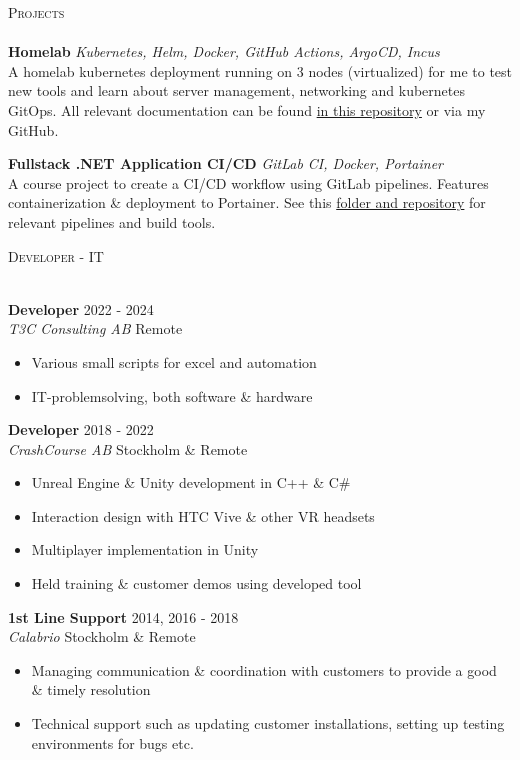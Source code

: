 \documentclass[a4paper]{article}
\newcommand{\lineunder} {
    \vspace*{-8pt} \\
    \hspace*{-18pt} \hrulefill \\
}
\newcommand{\header} [1] {
    {\hspace*{-18pt}\vspace*{6pt} \textsc{#1}}
    \vspace*{-6pt} \lineunder
}
\begin{document}
\header{Projects}
{\textbf{Homelab}} {\sl Kubernetes, Helm, Docker, GitHub Actions, ArgoCD, Incus} \\
A homelab kubernetes deployment running on 3 nodes (virtualized) for me to test new tools and learn about server management, networking and kubernetes GitOps. All relevant documentation can be found \href{https://github.com/pontusc/homelab}{in this repository} or via my GitHub.\\
\vspace{4mm}

{\textbf{Fullstack .NET Application CI/CD}} {\sl GitLab CI, Docker, Portainer} \\
A course project to create a CI/CD workflow using GitLab pipelines. Features containerization \& deployment to Portainer. See this \href{https://github.com/pontusc/devops-doe24/tree/main/pipeline-utilities}{folder and repository} for relevant pipelines and build tools.\\
\vspace{8mm}

\header{Developer - IT}
\vspace{4mm}

\textbf{Developer} \hfill 2022 - 2024\\
\textit{T3C Consulting AB} \hfill Remote\\
\vspace{-1mm}
\begin{itemize} \itemsep 1pt
  \item Various small scripts for excel and automation
  \item IT-problemsolving, both software \& hardware
\end{itemize}
\vspace{1mm}
\textbf{Developer} \hfill 2018 - 2022\\
\textit{CrashCourse AB} \hfill Stockholm \& Remote\\
\vspace{-1mm}
\begin{itemize} \itemsep 1pt
  \item Unreal Engine \& Unity development in C++ \& C\#
  \item Interaction design with HTC Vive \& other VR headsets
  \item Multiplayer implementation in Unity
  \item Held training \& customer demos using developed tool
\end{itemize}
\vspace{1mm}
\textbf{1st Line Support} \hfill 2014, 2016 - 2018\\
\textit{Calabrio} \hfill Stockholm \& Remote\\
\vspace{-1mm}
\begin{itemize} \itemsep 1pt
  \item Managing communication \& coordination with customers to provide a good \& timely resolution
  \item Technical support such as updating customer installations, setting up testing environments for bugs etc.
\end{itemize}
\vspace{8mm}
\ 
\end{document}
